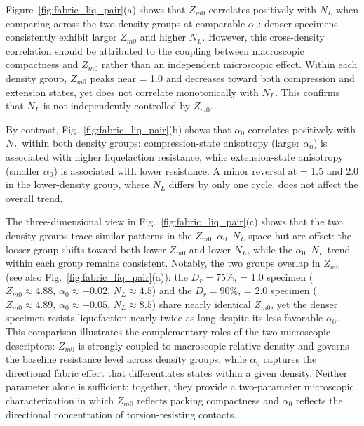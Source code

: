 Figure~\ref{fig:fabric_liq_pair}(a) shows that $Z_{m0}$ correlates positively with $N_L$ when comparing across the two density groups at comparable $\alpha_0$: denser specimens consistently exhibit larger $Z_{m0}$ and higher $N_L$. However, this cross-density correlation should be attributed to the coupling between macroscopic compactness and $Z_{m0}$ rather than an independent microscopic effect. Within each density group, $Z_{m0}$ peaks near \Kzero{} = 1.0 and decreases toward both compression and extension states, yet does not correlate monotonically with $N_L$. This confirms that $N_L$ is not independently controlled by $Z_{m0}$.

By contrast, Fig.~\ref{fig:fabric_liq_pair}(b) shows that $\alpha_0$ correlates positively with $N_L$ within both density groups: compression-state anisotropy (larger $\alpha_0$) is associated with higher liquefaction resistance, while extension-state anisotropy (smaller $\alpha_0$) is associated with lower resistance. A minor reversal at \Kzero{} = 1.5 and 2.0 in the lower-density group, where $N_L$ differs by only one cycle, does not affect the overall trend.

The three-dimensional view in Fig.~\ref{fig:fabric_liq_pair}(c) shows that the two density groups trace similar patterns in the $Z_{m0}$--$\alpha_0$--$N_L$ space but are offset: the looser group shifts toward both lower $Z_{m0}$ and lower $N_L$, while the $\alpha_0$--$N_L$ trend within each group remains consistent. Notably, the two groups overlap in $Z_{m0}$ (see also Fig.~\ref{fig:fabric_liq_pair}(a)): the $D_r = 75\%$, \Kzero{} = 1.0 specimen ($Z_{m0} \approx 4.88$, $\alpha_0 \approx +0.02$, $N_L \approx 4.5$) and the $D_r = 90\%$, \Kzero{} = 2.0 specimen ($Z_{m0} \approx 4.89$, $\alpha_0 \approx -0.05$, $N_L \approx 8.5$) share nearly identical $Z_{m0}$, yet the denser specimen resists liquefaction nearly twice as long despite its less favorable $\alpha_0$. This comparison illustrates the complementary roles of the two microscopic descriptors: $Z_{m0}$ is strongly coupled to macroscopic relative density and governs the baseline resistance level across density groups, while $\alpha_0$ captures the directional fabric effect that differentiates \Kzero{} states within a given density. Neither parameter alone is sufficient; together, they provide a two-parameter microscopic characterization in which $Z_{m0}$ reflects packing compactness and $\alpha_0$ reflects the directional concentration of torsion-resisting contacts.

